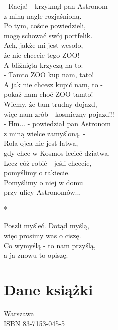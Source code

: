 \documentclass[11pt,a4pape,leqno,twoside]{book}
\begin{document}
- Racja! - krzyknął pan Astronom\\
z miną nagle rozjaśnioną. -\\
Po tym, coście powiedzieli,\\
mogę schować swój portfelik.\\
Ach, jakże mi jest wesoło,\\
że nie chcecie tego ZOO!\\
A bliźnięta krzyczą na to:\\
- Tamto ZOO kup nam, tato!\\
A jak nie chcesz kupić nam, to -\\
pokaż nam choć ZOO tamto!\\
Wiemy, że tam trudny dojazd,\\
więc nam zrób - kosmiczny pojazd!!!\\
- Hm... - powiedział pan Astronom\\
z miną wielce zamyśloną. -\\
Rola ojca nie jest łatwa,\\
gdy chce w Kosmos lecieć dziatwa.\\
Lecz cóż robić - jeśli chcecie,\\
pomyślimy o rakiecie.\\
Pomyślimy o niej w domu\\
przy ulicy Astronomów...\\ \vspace{0.1cm}

*\\ \vspace{0.1cm}

Poszli myśleć. Dotąd myślą,\\
więc prosimy was o ciszę.\\
Co wymyślą - to nam przyślą,\\
a ja znowu to opiszę.

\chapter{Dane książki}
Warszawa\\ \vspace{0.5cm}
ISBN 83-7153-045-5
\end{document}
